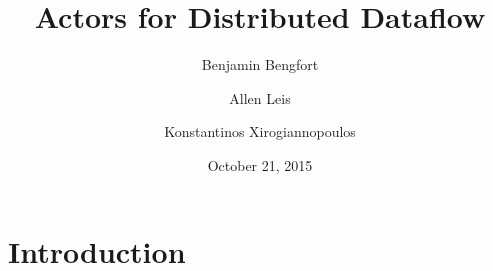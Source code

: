 \documentclass[11pt,letterpaper]{article}
\begin{document}
\title{Actors for Distributed Dataflow}
\author[1]{Benjamin Bengfort}
\author[2]{Allen Leis}
\author[1]{Konstantinos Xirogiannopoulos}

\date{October 21, 2015}

\maketitle
\section*{Introduction}



\end{document}
